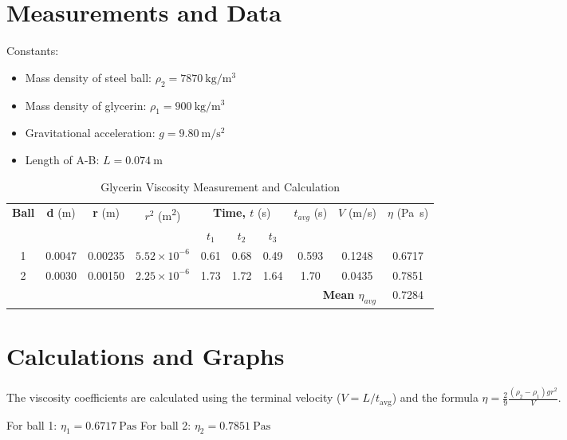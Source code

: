 \documentclass[12pt, a4paper]{article}
\begin{document}
\section{Measurements and Data}
Constants:
\begin{itemize}
	\item Mass density of steel ball: $\rho_2 = \SI{7870}{\kilo\gram\per\metre\cubed}$
	\item Mass density of glycerin: $\rho_1 = \SI{900}{\kilo\gram\per\metre\cubed}$
	\item Gravitational acceleration: $g = \SI{9.80}{\metre\per\second\squared}$
	\item Length of A-B: $L = \SI{0.074}{\metre}$
\end{itemize}

\begin{small}
	\begin{longtable}{|c|c|c|c|c|c|c|c|c|c|}
		\caption{Glycerin Viscosity Measurement and Calculation} \label{tab:olcum} \\
		\hline
		\textbf{Ball} & \textbf{d} (\si{m}) & \textbf{r} (\si{m}) & \textbf{$r^2$} (\si{m^2}) & \multicolumn{3}{c|}{\textbf{Time, $t$} (\si{s})} & \textbf{$t_{avg}$} (\si{s}) & \textbf{$V$} (\si{m/s}) & \textbf{$\eta$} (\si{Pa.s}) \\
		\cline{5-7}
		  &        &         &                       & \textbf{$t_1$} & \textbf{$t_2$} & \textbf{$t_3$} &       &        &        \\
		\hline
		1 & 0.0047 & 0.00235 & $5.52 \times 10^{-6}$ & 0.61           & 0.68           & 0.49           & 0.593 & 0.1248 & 0.6717 \\
		2 & 0.0030 & 0.00150 & $2.25 \times 10^{-6}$ & 1.73           & 1.72           & 1.64           & 1.70  & 0.0435 & 0.7851 \\
		\hline
		\multicolumn{9}{|r|}{\textbf{Mean $\eta_{avg}$}} & 0.7284 \\
		\hline
	\end{longtable}
\end{small}

\section{Calculations and Graphs}
The viscosity coefficients are calculated using the terminal velocity ($V = L / t_{\text{avg}}$) and the formula $\eta = \frac{2}{9} \frac{(\rho_2 - \rho_1) g r^2}{V}$.

For ball 1: $\eta_1 = \SI{0.6717}{\pascal\second}$  
For ball 2: $\eta_2 = \SI{0.7851}{\pascal\second}$  
\end{document}
